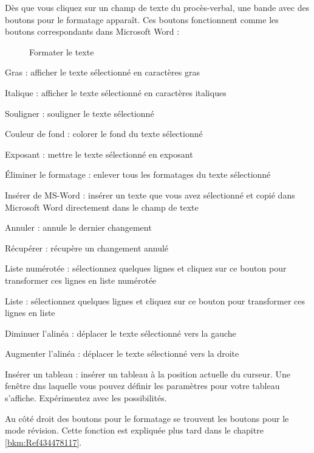 Dès que vous cliquez sur un champ de texte du procès-verbal, une bande avec des boutons pour le formatage  apparaît. Ces boutons fonctionnent comme les boutons correspondants dans Microsoft Word :

\begin{figure}[H]
\caption{Formater le texte}
\end{figure}

\begin{compactitem}
\item Gras : afficher le texte sélectionné en caractères gras
\item Italique : afficher le texte sélectionné en caractères italiques
\item Souligner : souligner le texte sélectionné
\item Couleur de fond : colorer le fond du texte sélectionné 
\item Exposant : mettre le texte sélectionné en exposant
\item Éliminer le formatage : enlever tous les formatages du texte sélectionné
\item Insérer de MS-Word : insérer un texte que vous avez sélectionné et copié dans Microsoft Word directement dans le champ de texte
\item Annuler : annule le dernier changement
\item Récupérer : récupère un changement annulé
\item Liste numérotée : sélectionnez quelques lignes et cliquez sur ce bouton pour transformer ces lignes en liste numérotée
\item Liste : sélectionnez quelques lignes et cliquez sur ce bouton pour transformer ces lignes en liste
\item Diminuer l'alinéa : déplacer le texte sélectionné vers la gauche
\item Augmenter l'alinéa : déplacer le texte sélectionné vers la droite
\item Insérer un tableau : insérer un tableau à la position actuelle du curseur. Une fenêtre dns laquelle vous pouvez définir les paramètres pour votre tableau s'affiche. Expérimentez avec les possibilités.
\end{compactitem}

\vspace{\baselineskip}

\begin{sloppypar}
Au côté droit des boutons pour le formatage se trouvent les boutons pour le mode révision. Cette fonction est expliquée plus tard dans le chapitre \ref{bkm:Ref434478117}.
\end{sloppypar}


